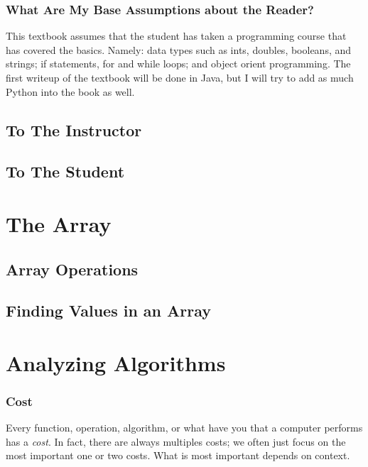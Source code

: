 \documentclass[10pt,a4paper]{book}
\begin{document}
\subsection{What Are My Base Assumptions about the Reader?}

This textbook assumes that the student has taken a programming course that has covered the basics.
Namely: data types such as ints, doubles, booleans, and strings; if statements, for and while loops; and object orient programming.
The first writeup of the textbook will be done in Java, but I will try to add as much Python into the book as well.


\section{To The Instructor}


\section{To The Student}




\chapter{The Array}

\section{Array Operations}

\section{Finding Values in an Array}

\chapter{Analyzing Algorithms}

\subsection{Cost}
Every function, operation, algorithm, or what have you that a computer performs has a \emph{cost}. In fact, there are always multiples costs;  we often just focus on the most important one or two costs.  
What is most important depends on context.
\end{document}
